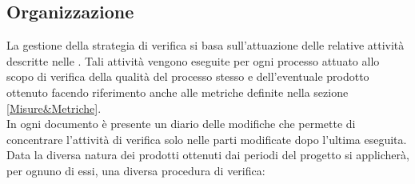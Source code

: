 \documentclass[../PianoDiQualifica.tex]{subfiles}
\begin{document}
		\subsection{Organizzazione}
			La gestione della strategia di verifica si basa sull'attuazione delle
			relative attività descritte nelle \normediprogettov. Tali attività vengono
			eseguite per ogni processo attuato allo scopo di verifica della qualità del
			processo stesso e dell'eventuale prodotto ottenuto facendo riferimento
			anche alle metriche definite nella sezione \ref{Misure&Metriche}.\\
			In ogni documento è presente un diario delle modifiche che permette di concentrare
			l'attività di verifica solo nelle parti modificate dopo l'ultima eseguita.\\
			Data la diversa natura dei prodotti ottenuti dai periodi del progetto si
			applicherà, per ognuno di essi, una diversa procedura di verifica:
\end{document}
